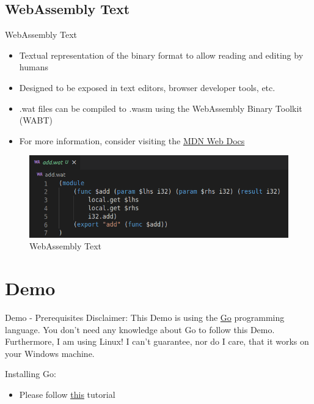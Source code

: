 \documentclass{beamer}
\begin{document}
\subsection{WebAssembly Text}
\begin{frame}[fragile]{WebAssembly Text}
    \begin{itemize}
        \item Textual representation of the binary format to allow reading and editing by humans
        \item Designed to be exposed in text editors, browser developer tools, etc.
        \item .wat files can be compiled to .wasm using the WebAssembly Binary Toolkit (WABT)
        \item For more information, consider visiting the \href{https://developer.mozilla.org/en-US/docs/WebAssembly/Understanding_the_text_format}{MDN Web Docs}
    \end{itemize}
    \begin{figure}
        \includegraphics[scale=0.3]{./images/wat.png}
        \caption{WebAssembly Text}
    \end{figure}
\end{frame}

\section{Demo}

\begin{frame}{Demo - Prerequisites}
    Disclaimer: This Demo is using the \href{https://go.dev/}{Go} programming language. You don't need any knowledge about Go to follow this Demo. Furthermore, I am using Linux! I can't guarantee, nor do I care, that it works on your Windows machine.

    Installing Go:
    \begin{itemize}
        \item Please follow \underline{\href{https://go.dev/doc/install}{this}} tutorial
    \end{itemize}

\end{frame}
\end{document}
